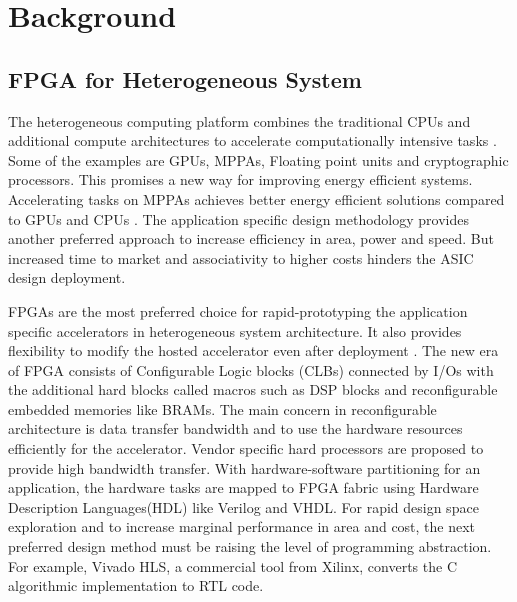 \chapter{Background}
\label{ch2_background}

\section{FPGA for Heterogeneous System}
The heterogeneous computing platform combines the traditional CPUs and additional compute architectures to accelerate computationally intensive tasks \cite{2}. Some of the examples are GPUs, MPPAs, Floating point units and cryptographic processors. This promises a new way for improving energy efficient systems. Accelerating tasks on MPPAs achieves better energy efficient solutions compared to GPUs and CPUs \cite{3}\cite{4}\cite{5}\cite{6}. The application specific design methodology provides another preferred approach to increase efficiency in area, power and speed. But increased time to market and associativity to higher costs hinders the ASIC design deployment.

FPGAs are the most preferred choice for rapid-prototyping the application specific accelerators in heterogeneous system architecture. It also provides flexibility to modify the hosted accelerator even after deployment \cite{7}\cite{8}\cite{9}. The new era of FPGA consists of Configurable Logic blocks (CLBs) connected by I/Os with the additional hard blocks called macros such as DSP blocks and reconfigurable embedded memories like BRAMs. The main concern in reconfigurable architecture is data transfer bandwidth and to use the hardware resources efficiently for the accelerator. Vendor specific hard processors are proposed \cite{10} to provide high bandwidth transfer. With hardware-software partitioning for an application, the hardware tasks are mapped to FPGA fabric using Hardware Description Languages(HDL) like Verilog and VHDL. For rapid design space exploration and to increase marginal performance in area and cost, the next preferred design method must be raising the level of programming abstraction. For example, Vivado HLS, a commercial tool from Xilinx, converts the C algorithmic implementation to RTL code.  

